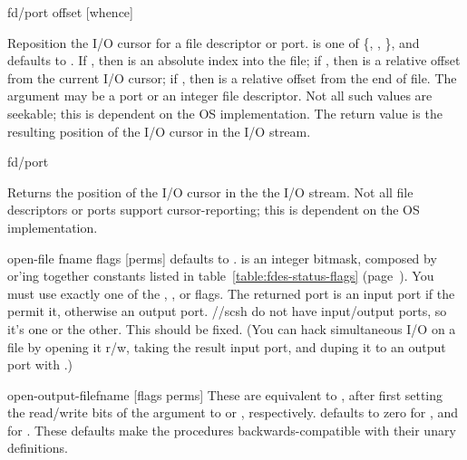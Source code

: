  {fd/port offset [whence]} {\integer}
\begin{desc}
Reposition the I/O cursor for a file descriptor or port.
 is one of \{, , \},
and defaults to .
If , then  is an absolute index into the file;
if , then  is a relative offset from the current
    I/O cursor;
if , then  is a relative offset from the end of file.
The  argument may be a port or an integer file descriptor.
Not all such values are seekable;
this is dependent on the OS implementation.
The return value is the resulting position of the I/O cursor in the I/O stream.
\end{desc}


 {fd/port} {\integer}
\begin{desc}
Returns the position of the I/O cursor in the the I/O stream.
Not all file descriptors or ports support cursor-reporting; 
this is dependent on the OS implementation.
\end{desc}

\begin{defundesc} {open-file} {fname flags [perms]} {\port}
   defaults to .
   is an integer bitmask, composed by or'ing together constants
  listed in table~\ref{table:fdes-status-flags} 
  (page~\pageref{table:fdes-status-flags}).
  You must use exactly one of the , , or
   flags.
%
  The returned port is an input port if the  permit it, 
  otherwise an output port. \RnRS/\scm/scsh do not have input/output ports,
  so it's one or the other. This should be fixed. (You can hack simultaneous
  I/O on a file by opening it r/w, taking the result input port, 
  and duping it to an output port with .)
\end{defundesc}

\port
\begin{defundescx}{open-output-file}{fname [flags perms]}\port
    These are equivalent to , after first setting the
    read/write bits of the  argument to  or
    , respectively.
     defaults to zero for , 
    and 
    for .
    These defaults make the procedures backwards-compatible with their
    unary {\RnRS} definitions.
\end{defundescx}

